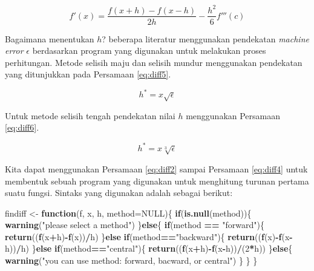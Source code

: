 \documentclass[]{book}
\newenvironment{Shaded}{\begin{snugshade}}{\end{snugshade}}
\newcommand{\ControlFlowTok}[1]{\textcolor[rgb]{0.13,0.29,0.53}{\textbf{#1}}}
\newcommand{\DataTypeTok}[1]{\textcolor[rgb]{0.13,0.29,0.53}{#1}}
\newcommand{\DecValTok}[1]{\textcolor[rgb]{0.00,0.00,0.81}{#1}}
\newcommand{\KeywordTok}[1]{\textcolor[rgb]{0.13,0.29,0.53}{\textbf{#1}}}
\newcommand{\NormalTok}[1]{#1}
\newcommand{\OperatorTok}[1]{\textcolor[rgb]{0.81,0.36,0.00}{\textbf{#1}}}
\newcommand{\OtherTok}[1]{\textcolor[rgb]{0.56,0.35,0.01}{#1}}
\newcommand{\StringTok}[1]{\textcolor[rgb]{0.31,0.60,0.02}{#1}}
\theoremstyle{definition}
\theoremstyle{definition}
\theoremstyle{definition}
\theoremstyle{remark}
\begin{document}
\begin{equation}
f'\left(x\right) = \frac{f\left(x+h\right)-f\left(x-h\right)}{2h} - \frac{h^2}{6} f'''\left(c\right)
  \label{eq:diff4}
\end{equation}

Bagaimana menentukan \(h\)? beberapa literatur menggunakan pendekatan \emph{machine error} \(\epsilon\) berdasarkan program yang digunakan untuk melakukan proses perhitungan. Metode selisih maju dan selisih mundur menggunakan pendekatan yang ditunjukkan pada Persamaan \eqref{eq:diff5}.

\begin{equation}
h^{\ast}=x\sqrt{\epsilon}
  \label{eq:diff5}
\end{equation}

Untuk metode selisih tengah pendekatan nilai \(h\) menggunakan Persamaan \eqref{eq:diff6}.

\begin{equation}
h^{\ast}=x\sqrt[3]{\epsilon}
  \label{eq:diff6}
\end{equation}

Kita dapat menggunakan Persamaan \eqref{eq:diff2} sampai Persamaan \eqref{eq:diff4} untuk membentuk sebuah program yang digunakan untuk menghitung turunan pertama suatu fungsi. Sintaks yang digunakan adalah sebagai berikut:

\begin{Shaded}
\begin{Highlighting}[]
\NormalTok{findiff <-}\StringTok{ }\ControlFlowTok{function}\NormalTok{(f, x, h, }\DataTypeTok{method=}\OtherTok{NULL}\NormalTok{)\{}
  \ControlFlowTok{if}\NormalTok{(}\KeywordTok{is.null}\NormalTok{(method))\{}
    \KeywordTok{warning}\NormalTok{(}\StringTok{"please select a method"}\NormalTok{)}
\NormalTok{  \}}\ControlFlowTok{else}\NormalTok{\{}
    \ControlFlowTok{if}\NormalTok{(method }\OperatorTok{==}\StringTok{ "forward"}\NormalTok{)\{}
      \KeywordTok{return}\NormalTok{((}\KeywordTok{f}\NormalTok{(x}\OperatorTok{+}\NormalTok{h)}\OperatorTok{-}\KeywordTok{f}\NormalTok{(x))}\OperatorTok{/}\NormalTok{h)}
\NormalTok{    \}}\ControlFlowTok{else} \ControlFlowTok{if}\NormalTok{(method}\OperatorTok{==}\StringTok{"backward"}\NormalTok{)\{}
      \KeywordTok{return}\NormalTok{((}\KeywordTok{f}\NormalTok{(x)}\OperatorTok{-}\KeywordTok{f}\NormalTok{(x}\OperatorTok{-}\NormalTok{h))}\OperatorTok{/}\NormalTok{h)}
\NormalTok{    \}}\ControlFlowTok{else} \ControlFlowTok{if}\NormalTok{(method}\OperatorTok{==}\StringTok{"central"}\NormalTok{)\{}
      \KeywordTok{return}\NormalTok{((}\KeywordTok{f}\NormalTok{(x}\OperatorTok{+}\NormalTok{h)}\OperatorTok{-}\KeywordTok{f}\NormalTok{(x}\OperatorTok{-}\NormalTok{h))}\OperatorTok{/}\NormalTok{(}\DecValTok{2}\OperatorTok{*}\NormalTok{h))}
\NormalTok{    \}}\ControlFlowTok{else}\NormalTok{\{}
      \KeywordTok{warning}\NormalTok{(}\StringTok{"you can use method: forward, bacward, or central"}\NormalTok{)}
\NormalTok{    \}}
\NormalTok{  \}}
\NormalTok{\}}
\end{Highlighting}
\end{Shaded}
\end{document}
